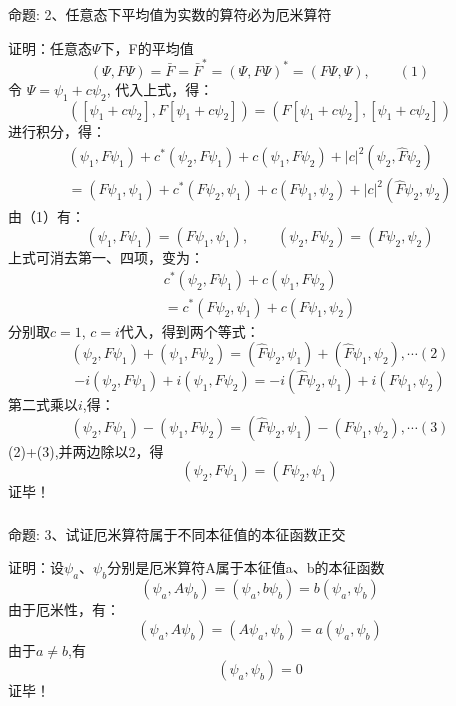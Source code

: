 \begin{frame} [allowframebreaks=]
    \frametitle{}
    \begin{tcolorbox1}{命题:}
       2、任意态下平均值为实数的算符必为厄米算符
    \end{tcolorbox1}
    \alert{证明：}任意态$\Psi$下，F的平均值
    $$(\Psi,F\Psi)=\bar{F}=\bar{F}^*=(\Psi,F\Psi)^*=(F\Psi,\Psi), \qquad (1) $$
    令 $\Psi= \psi_1+c\psi_2 $, 代入上式，得：
    $$([\psi_1+c\psi_2],F [\psi_1+c\psi_2])=(F[\psi_1+c\psi_2],[\psi_1+c\psi_2]) $$
    进行积分，得：
    $$
    \begin{array}{r}
    \left(\psi_{1}, F \psi_{1}\right)+c^{*}\left(\psi_{2}, F \psi_{1}\right)+c\left(\psi_{1}, F \psi_{2}\right)+|c|^{2}\left(\psi_{2}, \hat{F} \psi_{2}\right) \\
    =\left(F \psi_{1}, \psi_{1}\right)+c^{*}\left(F \psi_{2}, \psi_{1}\right)+c\left(F \psi_{1}, \psi_{2}\right)+|c|^{2}\left(\hat{F} \psi_{2}, \psi_{2}\right)
    \end{array}
    $$
    由（1）有： 
    $$(\psi_1,F\psi_1)=(F \psi_1, \psi_1), \qquad (\psi_2,F\psi_2)=(F \psi_2, \psi_2) $$
    上式可消去第一、四项，变为：
    $$\begin{array}{r}
        c^{*}\left(\psi_{2}, F \psi_{1}\right)+c\left(\psi_{1}, F \psi_{2}\right) \\
        =c^{*}\left(F \psi_{2}, \psi_{1}\right)+c\left(F \psi_{1}, \psi_{2}\right)
    \end{array}$$
    分别取$c=1$, $c=i$代入，得到两个等式：
    $$  \left(\psi_{2}, F \psi_{1}\right)+\left(\psi_{1}, F \psi_{2}\right) = 
    \left(\hat{F} \psi_{2}, \psi_{1}\right)+\left(\hat{F} \psi_{1}, \psi_{2}\right) , \cdots (2)
    $$
    $$
    -i\left(\psi_{2}, F \psi_{1}\right)+i\left(\psi_{1}, F \psi_{2}\right) 
    =-i\left(\hat{F} \psi_{2}, \psi_{1}\right)+i\left(F \psi_{1}, \psi_{2}\right)
    $$
    第二式乘以$i$,得：
    $$
    \left(\psi_{2}, F \psi_{1}\right)-\left(\psi_{1}, F \psi_{2}\right) 
    =\left(\hat{F} \psi_{2}, \psi_{1}\right)-\left(F \psi_{1}, \psi_{2}\right), \cdots (3)
    $$
    (2)+(3),并两边除以2，得
    $$
    \left(\psi_{2}, F \psi_{1}\right) =\left(F \psi_{2}, \psi_{1}\right)
    $$
    证毕！
\end{frame} 
\begin{frame} [allowframebreaks=]
    \frametitle{}
    \begin{tcolorbox1}{命题:}
        3、试证厄米算符属于不同本征值的本征函数正交
     \end{tcolorbox1}
    \alert{证明：}设$\psi_a$、$\psi_b$分别是厄米算符A属于本征值a、b的本征函数
    \begin{equation*}
        (\psi_a, A\psi_b)=(\psi_a, b\psi_b)=b(\psi_a, \psi_b)
    \end{equation*}  
    由于厄米性，有：
    \begin{equation*}
        (\psi_a, A\psi_b)=(A\psi_a, \psi_b)=a(\psi_a, \psi_b)
    \end{equation*}
    由于$a\neq b$,有
    \begin{equation*}
        (\psi_a, \psi_b)=0
    \end{equation*}
   证毕！
\end{frame} 

